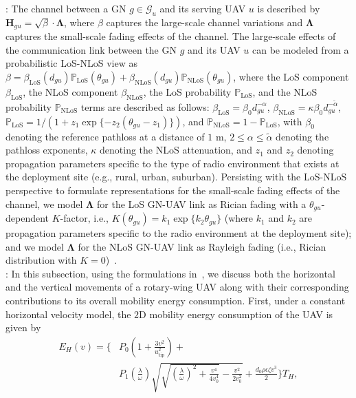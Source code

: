 \documentclass[10pt, twocolumn]{IEEEtran}
\begin{document}
: The channel between a GN $g{\in}\mathcal{G}_{u}$ and its serving UAV $u$ is described by $\mathbf{H}_{gu}{=}\sqrt{\beta}{\cdot}\boldsymbol{\Lambda}$, where $\beta$ captures the large-scale channel variations and $\boldsymbol{\Lambda}$ captures the small-scale fading effects of the channel. The large-scale effects of the communication link between the GN $g$ and its UAV $u$ can be modeled from a probabilistic LoS-NLoS view as $\beta{=}\beta_{\mathrm{LoS}}(d_{gu})\mathbb{P}_{\mathrm{LoS}}(\theta_{gu}){+}\beta_{\mathrm{NLoS}}(d_{gu})\mathbb{P}_{\mathrm{NLoS}}(\theta_{gu})$, where the LoS component $\beta_{\mathrm{LoS}}$, the NLoS component $\beta_{\mathrm{NLoS}}$, the LoS probability $\mathbb{P}_{\mathrm{LoS}}$, and the NLoS probability $\mathbb{P}_{\mathrm{NLoS}}$ terms are described as follows: $\beta_{\mathrm{LoS}}{=}\beta_{0}d_{gu}^{-\alpha}$, $\beta_{\mathrm{NLoS}}{=}\kappa\beta_{0}d_{gu}^{-\tilde{\alpha}}$, $\mathbb{P}_{\mathrm{LoS}}{=}1/(1{+}z_{1}\exp\{-z_{2}(\theta_{gu}{-}z_{1})\})$, and $\mathbb{P}_{\mathrm{NLoS}}{=}1{-}\mathbb{P}_{\mathrm{LoS}}$, with $\beta_{0}$ denoting the reference pathloss at a distance of $1$ m, $2{\leq}\alpha{\leq}\tilde{\alpha}$ denoting the pathloss exponents, $\kappa$ denoting the NLoS attenuation, and $z_{1}$ and $z_{2}$ denoting propagation parameters specific to the type of radio environment that exists at the deployment site (e.g., rural, urban, suburban). Persisting with the LoS-NLoS perspective to formulate representations for the small-scale fading effects of the channel, we model $\boldsymbol{\Lambda}$ for the LoS GN-UAV link as Rician fading with a $\theta_{gu}$-dependent $K$-factor, i.e., $K(\theta_{gu}){=}k_{1}\exp\{k_{2}\theta_{gu}\}$ (where $k_{1}$ and $k_{2}$ are propagation parameters specific to the radio environment at the deployment site); and we model $\boldsymbol{\Lambda}$ for the NLoS GN-UAV link as Rayleigh fading (i.e., Rician distribution with $K{=}0$)~\cite{MAESTRO_TCCN}.\\
: In this subsection, using the formulations in~\cite{UAV_Propulsion_1}, we discuss both the horizontal and the vertical movements of a rotary-wing UAV along with their corresponding contributions to its overall mobility energy consumption. First, under a constant horizontal velocity model, the $2$D mobility energy consumption of the UAV is given by
\vspace{-1mm}
\begin{align}\label{energy_constant_velocity}
    E_{H}(v) = \Bigg\{&P_{0}\left(1{+}\frac{3v^{2}}{u_{\mathrm{tip}}^{2}}\right) + \\&P_{1}\left(\frac{\lambda}{\omega}\right)\sqrt{\sqrt{\left(\frac{\lambda}{\omega}\right)^{2}{+}\frac{v^{4}}{4v_{0}^{4}}}{-}\frac{v^{2}}{2v_{0}^{2}}}{+}\frac{d_{0}\rho \epsilon \zeta v^{3}}{2}\Bigg\}T_{H},\nonumber
\end{align}
\end{document}
